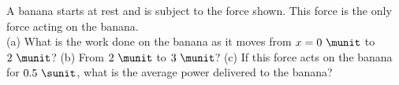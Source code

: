 A banana starts at rest and is subject to the force shown.
This force is the only force acting on the banana.\\
%
(a) What is the work done on the banana as it moves from $x = 0\ \munit$
to $2\ \munit$?\answercheck\hwendpart
%
(b) From $2\ \munit$ to $3\ \munit$?\answercheck\hwendpart
%
(c) If this force acts on the banana for $0.5\ \sunit$, what
is the average power delivered to the banana?\answercheck
